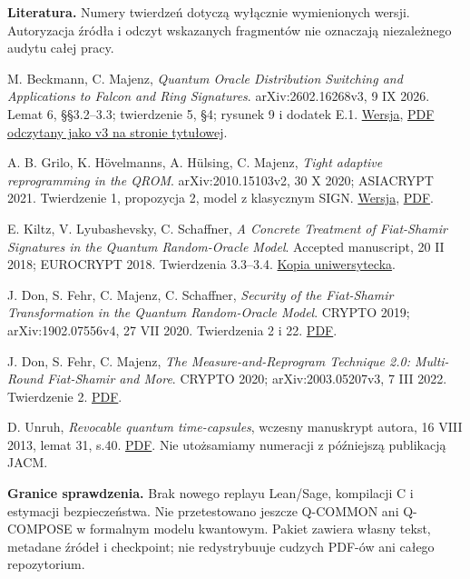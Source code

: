 \documentclass[10pt,a4paper]{article}
\begin{document}
\textbf{Literatura.} Numery twierdzeń dotyczą wyłącznie wymienionych wersji. Autoryzacja źródła i odczyt wskazanych fragmentów nie oznaczają niezależnego audytu całej pracy.
\begin{enumerate}[label={[\arabic*]},itemsep=7pt]
\item M. Beckmann, C. Majenz, \emph{Quantum Oracle Distribution Switching and Applications to Falcon and Ring Signatures}. arXiv:2602.16268v3, 9 IX 2026. Lemat 6, §§3.2--3.3; twierdzenie 5, §4; rysunek 9 i dodatek E.1. \href{https://arxiv.org/abs/2602.16268v3}{Wersja}, \href{https://arxiv.org/pdf/2602.16268}{PDF odczytany jako v3 na stronie tytułowej}.
\item A. B. Grilo, K. Hövelmanns, A. Hülsing, C. Majenz, \emph{Tight adaptive reprogramming in the QROM}. arXiv:2010.15103v2, 30 X 2020; ASIACRYPT 2021. Twierdzenie 1, propozycja 2, model z klasycznym SIGN. \href{https://arxiv.org/abs/2010.15103v2}{Wersja}, \href{https://arxiv.org/pdf/2010.15103}{PDF}.
\item E. Kiltz, V. Lyubashevsky, C. Schaffner, \emph{A Concrete Treatment of Fiat-Shamir Signatures in the Quantum Random-Oracle Model}. Accepted manuscript, 20 II 2018; EUROCRYPT 2018. Twierdzenia 3.3--3.4. \href{https://pure.uva.nl/ws/files/45974858/916.pdf}{Kopia uniwersytecka}.
\item J. Don, S. Fehr, C. Majenz, C. Schaffner, \emph{Security of the Fiat-Shamir Transformation in the Quantum Random-Oracle Model}. CRYPTO 2019; arXiv:1902.07556v4, 27 VII 2020. Twierdzenia 2 i 22. \href{https://arxiv.org/pdf/1902.07556}{PDF}.
\item J. Don, S. Fehr, C. Majenz, \emph{The Measure-and-Reprogram Technique 2.0: Multi-Round Fiat-Shamir and More}. CRYPTO 2020; arXiv:2003.05207v3, 7 III 2022. Twierdzenie 2. \href{https://arxiv.org/pdf/2003.05207}{PDF}.
\item D. Unruh, \emph{Revocable quantum time-capsules}, wczesny manuskrypt autora, 16 VIII 2013, lemat 31, s.40. \href{https://kodu.ut.ee/~unruh/publications/qtc.pdf}{PDF}. Nie utożsamiamy numeracji z późniejszą publikacją JACM.
\end{enumerate}

\textbf{Granice sprawdzenia.} Brak nowego replayu Lean/Sage, kompilacji C i estymacji bezpieczeństwa. Nie przetestowano jeszcze Q-COMMON ani Q-COMPOSE w formalnym modelu kwantowym. Pakiet zawiera własny tekst, metadane źródeł i checkpoint; nie redystrybuuje cudzych PDF-ów ani całego repozytorium.
\end{document}
